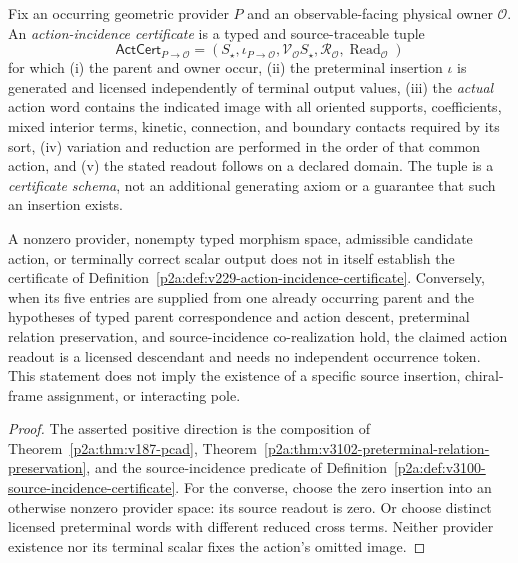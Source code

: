 \documentclass[12pt,a4paper]{article}
\begin{document}
\begin{definition}
\label{p2a:def:v229-action-incidence-certificate}
Fix an occurring geometric provider $P$ and an observable-facing physical
owner $\mathcal O$.  An \emph{action-incidence certificate} is a typed and
source-traceable tuple
\[
 \mathsf{ActCert}_{P\to\mathcal O}
 =(S_\star,\iota_{P\to\mathcal O},\mathscr V_{\mathcal O}S_\star,
    \mathcal R_{\mathcal O},\operatorname{Read}_{\mathcal O})
\]
for which (i) the parent and owner occur, (ii) the preterminal insertion
$\iota$ is generated and licensed independently of terminal output values,
(iii) the \emph{actual} action word contains the indicated image with all
oriented supports, coefficients, mixed interior terms, kinetic, connection,
and boundary contacts required by its sort, (iv) variation and reduction are
performed in the order of that common action, and (v) the stated readout
follows on a declared domain.  The tuple is a \emph{certificate schema}, not
an additional generating axiom or a guarantee that such an insertion exists.
\end{definition}

\begin{proposition}
\label{p2a:prop:v229-action-consumer-firewall}
A nonzero provider, nonempty typed morphism space, admissible candidate action,
or terminally correct scalar output does not in itself establish the
certificate of Definition~\ref{p2a:def:v229-action-incidence-certificate}.
Conversely, when its five entries are supplied from one already occurring
parent and the hypotheses of typed parent correspondence and action descent,
preterminal relation preservation, and source-incidence co-realization hold,
the claimed action readout is a licensed descendant and needs no independent
occurrence token.  This statement does not imply the existence of a
specific source insertion, chiral-frame assignment, or interacting pole.
\end{proposition}
\begin{proof}
The asserted positive direction is the composition of
Theorem~\ref{p2a:thm:v187-pcad},
Theorem~\ref{p2a:thm:v3102-preterminal-relation-preservation}, and the
source-incidence predicate of
Definition~\ref{p2a:def:v3100-source-incidence-certificate}.
For the converse, choose the zero insertion into an otherwise nonzero
provider space: its source readout is zero.  Or choose distinct licensed
preterminal words with different reduced cross terms.  Neither provider
existence nor its terminal scalar fixes the action's omitted image.
\end{proof}
\end{document}
